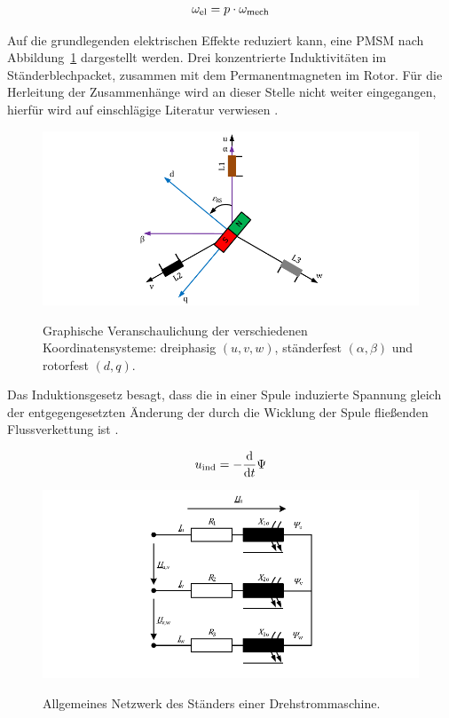 \begin{align}
\omega_{\mathrm{el}} = p \cdot\omega_{\mathrm{mech}}
\end{align}

Auf die grundlegenden elektrischen Effekte reduziert kann, eine PMSM nach Abbildung~\ref{fig:synchron-grundlage} dargestellt werden. Drei konzentrierte Induktivitäten im Ständerblechpacket, zusammen mit dem Permanentmagneten im Rotor.
Für die Herleitung der Zusammenhänge wird an dieser Stelle nicht weiter eingegangen, hierfür wird auf einschlägige Literatur verwiesen \autocites{mullerI2005}{fischer2009}{schroder2000}{kremser2004}.

\begin{figure}[h!]
\centering
\includegraphics{_Bilder/synchron-grundlage.pdf}
\label{fig:synchron-grundlage}
\caption{Graphische Veranschaulichung der verschiedenen Koordinatensysteme: dreiphasig $(u,
v, w)$, ständerfest $(\alpha, \beta)$ und rotorfest $(d, q)$.}
\end{figure}

Das Induktionsgesetz besagt, dass die in einer Spule induzierte Spannung gleich der entgegengesetzten Änderung der durch die Wicklung der Spule fließenden Flussverkettung ist \autocite{kellner2012}.

\begin{align}
u_{\mathrm{ind}} = - \frac{\mathrm{d}}{\mathrm{d}t}\Psi
\end{align}

\begin{figure}[h!]
\centering
\includegraphics{_Bilder/dq-synchron-rotorfest.pdf}
\label{fig:netzwerk-stander-drehstrom}
\caption{Allgemeines Netzwerk des Ständers einer Drehstrommaschine.}
\end{figure}

